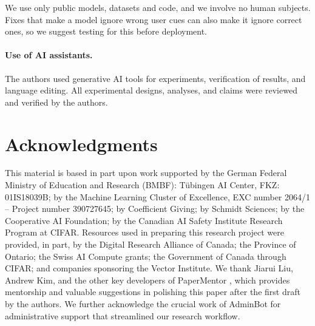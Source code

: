 \documentclass[11pt]{article}
\begin{document}
We use only public models, datasets and code, and we involve no human subjects. Fixes that make a model ignore wrong user cues can also make it ignore correct ones, so we suggest testing for this before deployment.

\paragraph{Use of AI assistants.} The authors used generative AI tools for experiments, verification of results, and language editing. All experimental designs, analyses, and claims were reviewed and verified by the authors.

\section*{Acknowledgments}
This material is based in part upon work supported
by the German Federal Ministry of Education and Research (BMBF): Tübingen AI Center, FKZ: 01IS18039B; by the Machine Learning Cluster of Excellence, EXC number 2064/1 – Project number 390727645; %
by Coefficient Giving; %
by Schmidt Sciences; %
by the Cooperative AI Foundation; by the Canadian AI Safety Institute Research Program at CIFAR. %
Resources used in preparing this research project were provided, in part, by the Digital Research Alliance of Canada; the Province of Ontario; the Swiss AI Compute grants; the Government of Canada through CIFAR; and companies sponsoring the Vector Institute.
We thank Jiarui Liu, Andrew Kim, and the other key developers of PaperMentor \citep{liu2026papermentorhumancenteredmultiagentwriting}, which provides mentorship and valuable suggestions in polishing this paper after the first draft by the authors. We further acknowledge the crucial work of AdminBot for administrative support that streamlined our research workflow.
\end{document}
